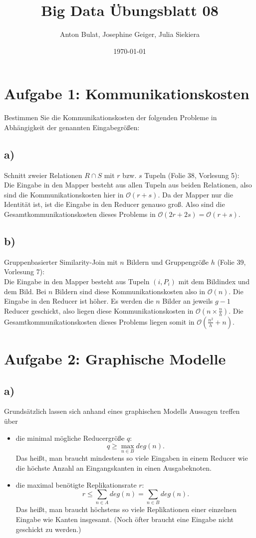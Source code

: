 \documentclass{article}
\title{Big Data \"Ubungsblatt 08}
\author{Anton Bulat, Josephine Geiger, Julia Siekiera} %
\date{\today} %
\begin{document}
\maketitle %

\section*{Aufgabe 1: Kommunikationskosten}
Bestimmen Sie die Kommunikationskosten der folgenden Probleme in Abh\"angigkeit der genannten Eingabegr\"o\ss en:

\subsection*{a)}
Schnitt zweier Relationen $R \cap S$ mit $r$ bzw. $s$ Tupeln (Folie 38, Vorlesung 5):\\
Die Eingabe in den Mapper besteht aus allen Tupeln aus beiden Relationen, also sind die Kommunikationskosten hier in $\mathcal{O}(r+s)$. Da der Mapper nur die Identit\"at ist, ist die Eingabe in den Reducer genauso gro\ss. Also sind die Gesamtkommunikationskosten dieses Problems in $\mathcal{O}(2r+2s)={\mathcal O}(r+s)$.

\subsection*{b)}
Gruppenbasierter Similarity-Join mit $n$ Bildern und Gruppengr\"o\ss e $h$ (Folie 39, Vorlesung 7):\\
Die Eingabe in den Mapper besteht aus Tupeln $(i,P_i)$ mit dem Bildindex und dem Bild. Bei $n$ Bildern sind diese Kommunikationskosten also in $\mathcal{O}(n)$. Die Eingabe in den Reducer ist h\"oher. Es werden die $n$ Bilder an jeweils $g-1$ Reducer geschickt, also liegen diese Kommunikationskosten in $\mathcal{O}(n\times\frac{n}{h})$. Die Gesamtkommunikationskosten dieses Problems liegen somit in $\mathcal{O}(\frac{n^2}{h}+n)$.

\section*{Aufgabe 2: Graphische Modelle}
\subsection*{a)}
Grunds\"atzlich lassen sich anhand eines graphischen Modells Aussagen treffen \"uber
\begin{itemize}
\item die minimal m\"ogliche Reducergr\"o\ss e $q$:
$$q \geq \max_{n\in B} deg(n).$$
Das hei\ss t, man braucht mindestens so viele Eingaben in einem Reducer wie die h\"ochste Anzahl an Eingangskanten in einen Ausgabeknoten.
\item die maximal ben\"otigte Replikationsrate $r$:
$$r \leq \sum_{n\in A}deg(n) = \sum_{n\in B}deg(n).$$
Das hei\ss t, man braucht h\"ochstens so viele Replikationen einer einzelnen Eingabe wie Kanten insgesamt. (Noch \"ofter braucht eine Eingabe nicht geschickt zu werden.)
\end{itemize}
\end{document}
